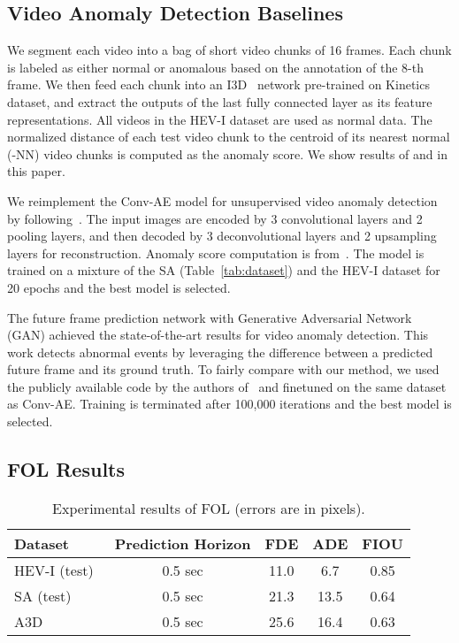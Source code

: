 \documentclass[letterpaper, 10 pt, conference]{ieeeconf}
\theoremstyle{definition}
\theoremstyle{remark}
\begin{document}
\subsection{Video Anomaly Detection Baselines}
We segment each video into a bag of short video chunks of 16 frames. Each 
chunk is labeled as either normal or anomalous based on the
annotation of the 8-th frame. We then feed each chunk into an I3D~\cite{carreira2017quo}
network pre-trained on Kinetics dataset, and extract the outputs
of the last fully connected layer as its feature representations.
All videos in the HEV-I dataset are used as normal data. The normalized distance
of each test video chunk to the centroid of its  nearest normal
(-NN) video chunks is computed as the anomaly score. We show
results of  and  in this paper.

 We reimplement the Conv-AE
model for unsupervised video anomaly detection by
following~\cite{hasan2016learning}.
The input images are encoded by 3
convolutional layers and 2 pooling layers, and then decoded by 3
deconvolutional layers and 2 upsampling layers for
reconstruction.
Anomaly score computation is from~\cite{hasan2016learning}.
The model is trained on a mixture of the SA (Table~\ref{tab:dataset})
and the HEV-I dataset for 20 epochs and the best
model is selected.

The future frame prediction network with Generative Adversarial Network (GAN)
achieved the state-of-the-art results for video anomaly detection.
This work detects abnormal events by
leveraging the difference between a predicted future frame and its
ground truth. To fairly compare with our method, we used
the publicly available code by the authors of~\cite{liu2018future} and finetuned on the same
dataset as Conv-AE. Training is terminated after 100,000 iterations
and the best model is selected.

\subsection{FOL Results}

\begin{table}[t]
    \vspace{5pt}
    \centering
    \renewcommand{\arraystretch}{1.3}
    \caption{Experimental results of FOL (errors are in pixels).}
    \label{tab:fol_result}
    \begin{tabular}{lcccc}
        \toprule
        Dataset  & Prediction Horizon & FDE  & ADE  & FIOU \\
        \midrule 
        HEV-I (test)~\cite{yao2018egocentric} & 0.5 sec & 11.0 & 6.7 & 0.85 \\
        SA (test)~\cite{chan2016anticipating} & 0.5 sec & 21.3 & 13.5 & 0.64 \\
        A3D & 0.5 sec & 25.6 & 16.4 & 0.63 \\
        \bottomrule
    \end{tabular}
    \vspace{-5pt}
\end{table}
\end{document}
